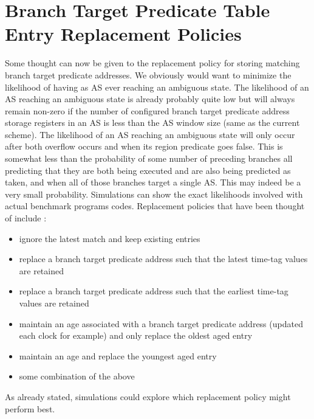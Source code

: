 \documentclass[10pt,dvips]{article}
\begin{document}
\section{Branch Target Predicate Table Entry Replacement Policies}
%
Some thought can now be given to the replacement policy for storing
matching branch target predicate addresses.  We obviously would want to
minimize the likelihood of having as AS ever reaching an ambiguous
state.  The likelihood of an AS reaching an ambiguous state is already
probably quite low but will always remain non-zero if the number of
configured branch target predicate address storage registers in an AS
is less than the AS window size (same as the current scheme).  The
likelihood of an AS reaching an ambiguous state will only occur after
both overflow occurs and when its region predicate goes false.  
This is somewhat less than the probability of some number of preceding
branches all predicting that they are both being executed and are
also being predicted as taken, and when 
all of those branches target a single AS.  
This may indeed be a very small probability.
Simulations can show the exact likelihoods
involved with actual benchmark programs codes.  
Replacement policies that have been thought
of include :
%
\begin{itemize}
\item{ignore the latest match and keep existing entries}
\item{replace a branch target predicate address such that
the latest time-tag values are retained}
\item{replace a branch target predicate address such that
the earliest time-tag values are retained}
\item{maintain an age associated with a branch target predicate address
(updated each clock for example) and only replace the oldest aged
entry}
\item{maintain an age and replace the youngest aged entry}
\item{some combination of the above}
\end{itemize}   
%
As already stated, simulations could explore which replacement policy
might perform best.
%
\end{document}
